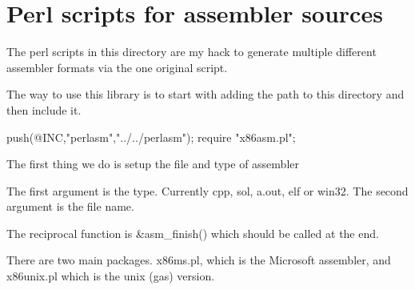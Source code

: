 \chapter{Perl scripts for assembler sources}
\hypertarget{md__c_1_2_users_2namph_2_downloads_2openssl_2openssl-3_82_81_2crypto_2perlasm_2_r_e_a_d_m_e}{}\label{md__c_1_2_users_2namph_2_downloads_2openssl_2openssl-3_82_81_2crypto_2perlasm_2_r_e_a_d_m_e}
The perl scripts in this directory are my \textquotesingle{}hack\textquotesingle{} to generate multiple different assembler formats via the one original script.

The way to use this library is to start with adding the path to this directory and then include it. \begin{DoxyVerb}push(@INC,"perlasm","../../perlasm");
require "x86asm.pl";
\end{DoxyVerb}
 The first thing we do is setup the file and type of assembler 
 The first argument is the \textquotesingle{}type\textquotesingle{}. Currently {\ttfamily cpp}, {\ttfamily sol}, {\ttfamily a.\+out}, {\ttfamily elf} or {\ttfamily win32}. The second argument is the file name.

The reciprocal function is {\ttfamily \&asm\+\_\+finish()} which should be called at the end.

There are two main \textquotesingle{}packages\textquotesingle{}. {\ttfamily x86ms.\+pl}, which is the Microsoft assembler, and {\ttfamily x86unix.\+pl} which is the unix (gas) version.

